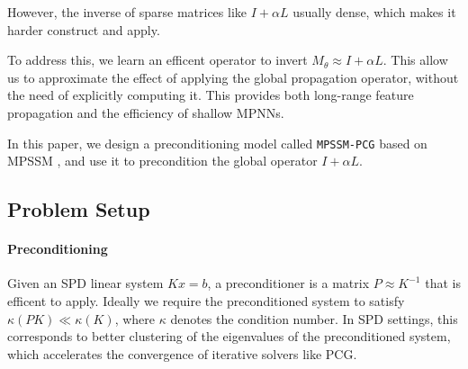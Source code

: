 %
%
%
%
%

However, the inverse of sparse matrices like $I + \alpha L$ usually dense,
which makes it harder construct and apply.

To address this, we learn an efficent operator to invert $M_\theta
    \approx I + \alpha L$. This allow us to approximate the effect of
applying the global propagation operator, without the need of explicitly
computing it. This provides both long-range feature propagation and the
efficiency of shallow MPNNs.

In this paper, we design a preconditioning model called \texttt{MPSSM-PCG}
based on MPSSM \cite{ceniMessagePassingStateSpaceModels2025}, and use it to
precondition the global operator  $I + \alpha L$.

\subsection{Problem Setup}

\paragraph{Preconditioning}
Given an SPD linear system $Kx = b$, a preconditioner is a matrix $P \approx
    K^{-1}$ that is efficent to apply. Ideally we require the preconditioned system
to satisfy $\kappa(PK) \ll \kappa(K)$, where $\kappa$ denotes the condition
number. In SPD settings, this corresponds to better clustering of the
eigenvalues of the preconditioned system, which accelerates the convergence of
iterative solvers like PCG.

